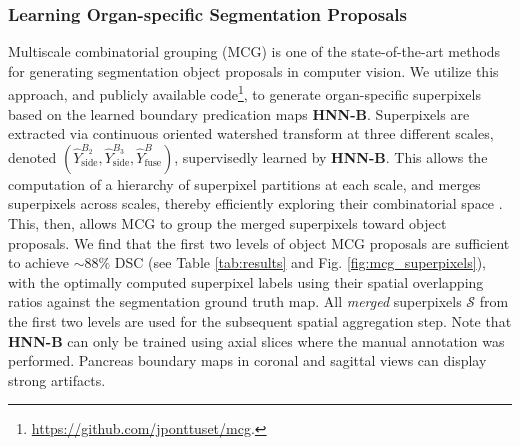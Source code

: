 \documentclass[journal]{IEEEtran}
\begin{document}
\subsubsection{Learning Organ-specific Segmentation Proposals}\label{sec:segPro} Multiscale combinatorial grouping (MCG) \cite{pont-tuset2015mcg} is one of the state-of-the-art methods for generating segmentation object proposals in computer vision. We utilize this approach, and publicly available code\footnote{\scriptsize\url{https://github.com/jponttuset/mcg}.}, to generate organ-specific superpixels based on the learned boundary predication maps \textbf{HNN-B}. Superpixels are extracted via continuous oriented watershed transform at three different scales, denoted $(\hat{Y}_\mathrm{side}^{B_2}, \hat{Y}_\mathrm{side}^{B_3} , \hat{Y}_\mathrm{fuse}^{B})$, supervisedly learned by \textbf{HNN-B}. This allows the computation of a hierarchy of superpixel partitions at each scale, and merges superpixels across scales, thereby efficiently exploring their combinatorial space \cite{pont-tuset2015mcg}. This, then, allows MCG to group the merged superpixels toward object proposals. We find that the first two levels of object MCG proposals are sufficient to achieve $\sim88\%$ DSC (see Table \ref{tab:results} and Fig. \ref{fig:mcg_superpixels}), with the optimally computed superpixel labels using their spatial overlapping ratios against the segmentation ground truth map. All \textit{merged} superpixels $\mathcal{S}$ from the first two levels are used for the subsequent spatial aggregation step. Note that \textbf{HNN-B} can only be trained using axial slices where the manual annotation was performed. Pancreas boundary maps in coronal and sagittal views can display strong artifacts.
\end{document}
